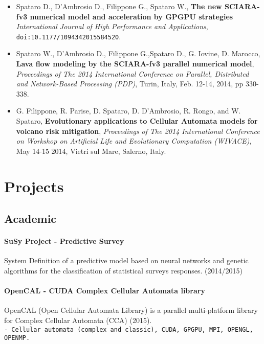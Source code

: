 \documentclass[a4paper,10pt]{article}
\begin{document}
\begin{itemize}
	\item Spataro D., D'Ambrosio D., Filippone G., Spataro W., \textbf{The new
	SCIARA-fv3 numerical model and acceleration by GPGPU strategies}
	\emph{International Journal of High Performance and Applications},
	\texttt{doi:10.1177/1094342015584520}.
	
	\item Spataro W., D'Ambrosio D., Filippone G.,Spataro D., G.
    Iovine, D. Marocco, \textbf{Lava flow modeling by the SCIARA-fv3
    parallel numerical model}, \emph{Proceedings of The 2014 International
    Conference on Parallel, Distributed and Network-Based Processing (PDP)}, Turin, Italy, Feb. 12-14,
    2014, pp 330-338.
    
    \item G. Filippone, R. Parise, D. Spataro,
	D. D'Ambrosio, R. Rongo, and W. Spataro, \textbf{Evolutionary
	applications to Cellular Automata models for volcano risk mitigation},
	\emph{Proceedings of The 2014 International Conference on Workshop on Artificial Life and
	Evolutionary Computation (WIVACE)}, May 14-15 2014, Vietri sul Mare, Salerno,
	Italy.
   

\end{itemize}

\begin{center}
\mbox{}
\end{center}

\section{Projects}

\subsection{Academic}
 \paragraph{SuSy Project - Predictive Survey}
 System Definition of a predictive
 model based on neural networks and genetic algorithms for the classification of
 statistical surveys responses. (2014/2015)

\paragraph{OpenCAL - CUDA Complex Cellular Automata library} 
OpenCAL (Open Cellular Automata Library) is a parallel multi-platform library
for Complex Cellular Automata (CCA) (2015).
\hfill \\
\texttt{- \noindent Cellular automata (complex and classic), CUDA, GPGPU, MPI, OPENGL,
OPENMP.}
 
\end{document}
